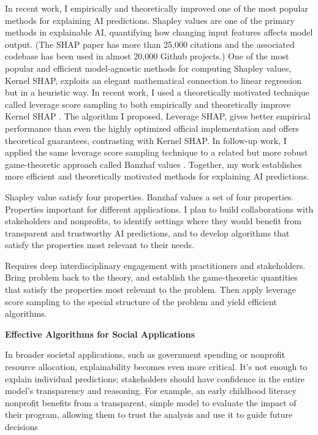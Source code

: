 \documentclass[11pt]{article}
\begin{document}
{In recent work, I empirically and theoretically improved one of the most popular methods for explaining AI predictions. Shapley values are one of the primary methods in explainable AI, quantifying how changing input features affects model output. (The SHAP paper has more than 25,000 citations and the associated codebase has been used in almost 20,000 Github projects.) One of the most popular and efficient model-agnostic methods for computing Shapley values, Kernel SHAP, exploits an elegant mathematical connection to linear regression but in a heuristic way. In recent work, I used a theoretically motivated technique called leverage score sampling to both empirically and theoretically improve Kernel SHAP \cite{musco2024leverage}. The algorithm I proposed, Leverage SHAP, gives better empirical performance than even the highly optimized official implementation and offers theoretical guarantees, contrasting with Kernel SHAP. In follow-up work, I applied the same leverage score sampling technique to a related but more robust game-theoretic approach called Banzhaf values \cite{liu2024kernel}. Together, my work establishes more efficient and theoretically motivated methods for explaining AI predictions.

Shapley value satisfy four properties.
Banzhaf values a set of four properties.
Properties important for different applications.
I plan to build collaborations with stakeholders and nonprofits, to identify settings where they would benefit from transparent and trustworthy AI predictions, and to develop algorithms that satisfy the properties most relevant to their needs.

Requires deep interdisciplinary engagement with practitioners and stakeholders.
Bring problem back to the theory, and establish the game-theoretic quantities that satisfy the properties most relevant to the problem.
Then apply leverage score sampling to the special structure of the problem and yield efficient algorithms.

{\large \textbf{Effective Algorithms for Social Applications}}

In broader societal applications, such as government spending or nonprofit resource allocation, explainability becomes even more critical. It’s not enough to explain individual predictions; stakeholders should have confidence in the entire model’s transparency and reasoning. For example, an early childhood literacy nonprofit benefits from a transparent, simple model to evaluate the impact of their program, allowing them to trust the analysis and use it to guide future decisions

}
\end{document}

